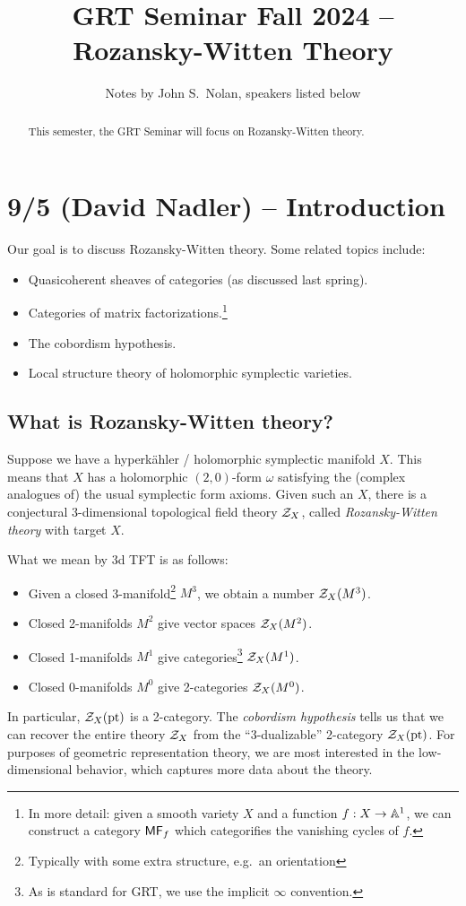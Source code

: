 \documentclass{article}
\title{GRT Seminar Fall 2024 -- Rozansky-Witten Theory}
\author{Notes by John S.\ Nolan, speakers listed below}
\begin{document}
\maketitle

\begin{abstract}
	This semester, the GRT Seminar will focus on Rozansky-Witten theory.
\end{abstract}

\tableofcontents

\section{9/5 (David Nadler) -- Introduction}

Our goal is to discuss Rozansky-Witten theory.
Some related topics include:
\begin{itemize}
	\item Quasicoherent sheaves of categories (as discussed last spring).
	\item Categories of matrix factorizations.\footnote{In more detail: given a smooth variety $X$ and a function $f: X \to \AA^1$, we can construct a category $\MF_f$ which categorifies the vanishing cycles of $f$.}
	\item The cobordism hypothesis.
	\item Local structure theory of holomorphic symplectic varieties.
\end{itemize}

\subsection{What is Rozansky-Witten theory?}

Suppose we have a hyperk\"ahler / holomorphic symplectic manifold $X$.
This means that $X$ has a holomorphic $(2, 0)$-form $\omega$ satisfying the (complex analogues of) the usual symplectic form axioms.
Given such an $X$, there is a conjectural 3-dimensional topological field theory $\Zc_X$, called \emph{Rozansky-Witten theory} with target $X$.

What we mean by 3d TFT is as follows:
\begin{itemize}
	\item Given a closed 3-manifold\footnote{Typically with some extra structure, e.g.\ an orientation} $M^3$, we obtain a number $\Zc_X(M^3)$.
	\item Closed 2-manifolds $M^2$ give vector spaces $\Zc_X(M^2)$.
	\item Closed 1-manifolds $M^1$ give categories\footnote{As is standard for GRT, we use the implicit $\infty$ convention.} $\Zc_X(M^1)$.
	\item Closed 0-manifolds $M^0$ give 2-categories $\Zc_X(M^0)$.
\end{itemize}
In particular, $\Zc_X(\pt)$ is a 2-category.
The \emph{cobordism hypothesis} tells us that we can recover the entire theory $\Zc_X$ from the ``3-dualizable'' 2-category $\Zc_X(\pt)$.
For purposes of geometric representation theory, we are most interested in the low-dimensional behavior, which captures more data about the theory.
\end{document}
